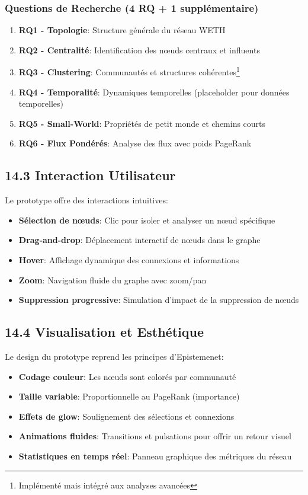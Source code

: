 \documentclass[12pt,a4paper]{article}
\begin{document}
\subsubsection*{Questions de Recherche (4 RQ + 1 supplémentaire)}
\begin{enumerate}
  \item \textbf{RQ1 - Topologie}: Structure générale du réseau WETH
  \item \textbf{RQ2 - Centralité}: Identification des nœuds centraux et influents
  \item \textbf{RQ3 - Clustering}: Communautés et structures cohérentes\footnote{Implémenté mais intégré aux analyses avancées}
  \item \textbf{RQ4 - Temporalité}: Dynamiques temporelles (placeholder pour données temporelles)
  \item \textbf{RQ5 - Small-World}: Propriétés de petit monde et chemins courts
  \item \textbf{RQ6 - Flux Pondérés}: Analyse des flux avec poids PageRank
\end{enumerate}

\subsection*{14.3 Interaction Utilisateur}

Le prototype offre des interactions intuitives:
\begin{itemize}
  \item \textbf{Sélection de nœuds}: Clic pour isoler et analyser un nœud spécifique
  \item \textbf{Drag-and-drop}: Déplacement interactif de nœuds dans le graphe
  \item \textbf{Hover}: Affichage dynamique des connexions et informations
  \item \textbf{Zoom}: Navigation fluide du graphe avec zoom/pan
  \item \textbf{Suppression progressive}: Simulation d'impact de la suppression de nœuds
\end{itemize}

\subsection*{14.4 Visualisation et Esthétique}

Le design du prototype reprend les principes d'Epistemenet:
\begin{itemize}
  \item \textbf{Codage couleur}: Les nœuds sont colorés par communauté
  \item \textbf{Taille variable}: Proportionnelle au PageRank (importance)
  \item \textbf{Effets de glow}: Soulignement des sélections et connexions
  \item \textbf{Animations fluides}: Transitions et pulsations pour offrir un retour visuel
  \item \textbf{Statistiques en temps réel}: Panneau graphique des métriques du réseau
\end{itemize}
\end{document}
